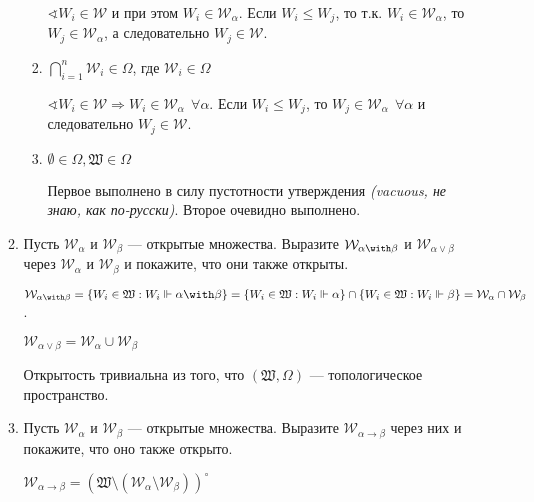 \begin{enumerate}[wide, labelwidth=!, labelindent=0pt]
\begin{enumerate}
\begin{enumerate}
                              \(\sphericalangle W_i \in \mathcal{W}\) и при этом \(W_i\in \mathcal{W}_\alpha\). Если \(W_i \leq W_j\), то т.к. \(W_i \in \mathcal{W}_\alpha\), то \(W_j \in \mathcal{W}_\alpha\), а следовательно \(W_j \in \mathcal{W}\).

                        \item \(\bigcap_{i = 1}^{n} \mathcal{W}_i \in \Omega\), где \(\mathcal{W}_i \in\Omega\)

                              \(\sphericalangle W_i \in \mathcal{W} \Rightarrow W_i \in \mathcal{W}_\alpha \ \ \forall \alpha\). Если \(W_i \leq W_j\), то \(W_j \in \mathcal{W}_\alpha \ \ \forall \alpha\) и следовательно \(W_j \in \mathcal{W}\).

                        \item \(\emptyset\in\Omega, \mathfrak{W}\in \Omega\)

                              Первое выполнено в силу пустотности утверждения \textit{(vacuous, не знаю, как по-русски)}. Второе очевидно выполнено.
                    \end{enumerate}

              \item Пусть $\mathcal{W}_\alpha$ и $\mathcal{W}_\beta$ --- открытые множества. Выразите $\mathcal{W}_{\alpha\with\beta}$ и $\mathcal{W}_{\alpha\vee\beta}$
                    через $\mathcal{W}_\alpha$ и $\mathcal{W}_\beta$ и покажите, что они также открыты.

                    \(\mathcal{W}_{\alpha \with \beta} = \{W_i \in \mathfrak{W} : W_i \Vdash \alpha \with \beta\} = \{W_i \in \mathfrak{W} : W_i \Vdash \alpha\} \cap \{W_i \in \mathfrak{W} : W_i \Vdash \beta\} = \mathcal{W}_\alpha \cap \mathcal{W}_\beta\).

                    \(\mathcal{W}_{\alpha \lor \beta} = \mathcal{W}_\alpha \cup \mathcal{W}_\beta\)

                    Открытость тривиальна из того, что \((\mathfrak{W}, \Omega)\) --- топологическое пространство.

              \item Пусть $\mathcal{W}_\alpha$ и $\mathcal{W}_\beta$ --- открытые множества. Выразите $\mathcal{W}_{\alpha\rightarrow\beta}$ через
                    них и покажите, что оно также открыто.

                    \(\mathcal{W}_{\alpha \to \beta} = (\mathfrak{W} \setminus (\mathcal{W}_\alpha \setminus \mathcal{W}_\beta))^\circ\)


\end{enumerate}
\end{enumerate}

